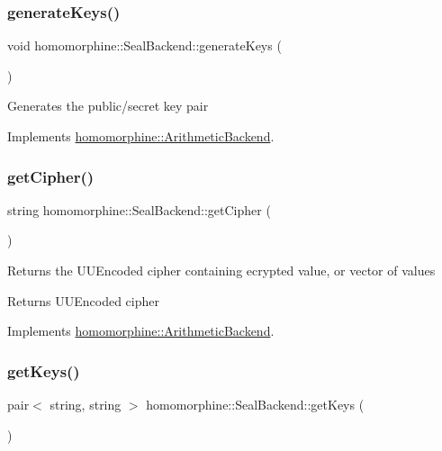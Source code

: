 \subsubsection{\texorpdfstring{generate\+Keys()}{generateKeys()}}
{\footnotesize\ttfamily void homomorphine\+::\+Seal\+Backend\+::generate\+Keys (\begin{DoxyParamCaption}{ }\end{DoxyParamCaption})\hspace{0.3cm}{\ttfamily [virtual]}}

Generates the public/secret key pair 

Implements \hyperlink{classhomomorphine_1_1_arithmetic_backend_a5faa0089b80be5629d4a0a7a02fe3568}{homomorphine\+::\+Arithmetic\+Backend}.

\mbox{\label{classhomomorphine_1_1_seal_backend_a0917c586791e74b83f4ca0932e5e4d8e}} 
\subsubsection{\texorpdfstring{get\+Cipher()}{getCipher()}}
{\footnotesize\ttfamily string homomorphine\+::\+Seal\+Backend\+::get\+Cipher (\begin{DoxyParamCaption}{ }\end{DoxyParamCaption})\hspace{0.3cm}{\ttfamily [virtual]}}

Returns the U\+U\+Encoded cipher containing ecrypted value, or vector of values

\begin{DoxyReturn}{Returns}
U\+U\+Encoded cipher 
\end{DoxyReturn}


Implements \hyperlink{classhomomorphine_1_1_arithmetic_backend_acf38918fb556703ccb12b63dc73b15ed}{homomorphine\+::\+Arithmetic\+Backend}.

\mbox{\label{classhomomorphine_1_1_seal_backend_a30358e6405e2d1470468cf55aefb3f4d}} 
\subsubsection{\texorpdfstring{get\+Keys()}{getKeys()}}
{\footnotesize\ttfamily pair$<$ string, string $>$ homomorphine\+::\+Seal\+Backend\+::get\+Keys (\begin{DoxyParamCaption}{ }\end{DoxyParamCaption})\hspace{0.3cm}{\ttfamily [virtual]}}


